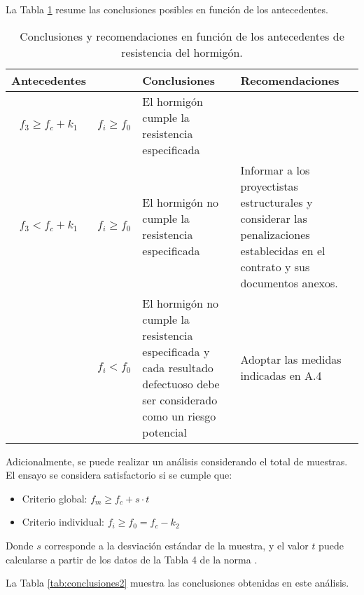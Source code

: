 La Tabla \ref{tab:conclusiones} resume las conclusiones posibles en función de los antecedentes.

\begin{table}[H]
\centering
\begin{tabular}{|c|c|p{6cm}|p{6cm}|}
\hline
\textbf{Antecedentes} &  & \textbf{Conclusiones} & \textbf{Recomendaciones} \\ \hline
$f_{3} \geq f_{c} + k_{1}$ & $f_{i} \geq f_{0}$ & 
El hormigón cumple la resistencia especificada & \\ \hline

$f_{3} < f_{c} + k_{1}$ & $f_{i} \geq f_{0}$ & 
El hormigón no cumple la resistencia especificada & 
Informar a los proyectistas estructurales y considerar las penalizaciones establecidas en el contrato y sus documentos anexos. \\ \hline

 & $f_{i} < f_{0}$ & 
El hormigón no cumple la resistencia especificada y cada resultado defectuoso debe ser considerado como un riesgo potencial & 
Adoptar las medidas indicadas en A.4 \\ \hline
\end{tabular}
\caption{Conclusiones y recomendaciones en función de los antecedentes de resistencia del hormigón.}
\label{tab:conclusiones}
\end{table}

Adicionalmente, se puede realizar un análisis considerando el total de muestras. El ensayo se considera satisfactorio si se cumple que:

\begin{itemize}
    \item Criterio global: $f_{m} \geq f_{c} + s \cdot t$
    \item Criterio individual: $f_{i} \geq f_{0} = f_c - k_2$
\end{itemize}

Donde $s$ corresponde a la desviación estándar de la muestra, y el valor $t$ puede calcularse a partir de los datos de la Tabla 4 de la norma \cite{NCh1998}.

La Tabla \ref{tab:conclusiones2} muestra las conclusiones obtenidas en este análisis.

